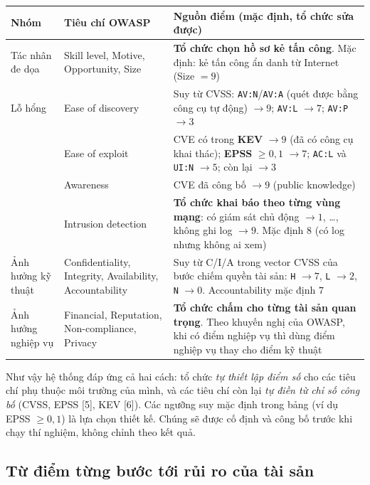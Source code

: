 \documentclass[11pt,a4paper]{article}
\begin{document}
\begin{center}
\small
\begin{tabular}{@{}Y{2.6cm}Y{3.4cm}Y{9.0cm}@{}}
\toprule
\textbf{Nhóm} & \textbf{Tiêu chí OWASP} & \textbf{Nguồn điểm (mặc định, tổ chức sửa được)} \\
\midrule
Tác nhân đe dọa & Skill level, Motive, Opportunity, Size & \textbf{Tổ chức chọn hồ sơ kẻ tấn công}. Mặc định: kẻ tấn công ẩn danh từ Internet (Size $= 9$) \\
\midrule
Lỗ hổng & Ease of discovery & Suy từ CVSS: \texttt{AV:N}/\texttt{AV:A} (quét được bằng công cụ tự động) $\to 9$; \texttt{AV:L} $\to 7$; \texttt{AV:P} $\to 3$ \\
 & Ease of exploit & CVE có trong \textbf{KEV} $\to 9$ (đã có công cụ khai thác); \textbf{EPSS} $\ge 0{,}1$ $\to 7$; \texttt{AC:L} và \texttt{UI:N} $\to 5$; còn lại $\to 3$ \\
 & Awareness & CVE đã công bố $\to 9$ (public knowledge) \\
 & Intrusion detection & \textbf{Tổ chức khai báo theo từng vùng mạng}: có giám sát chủ động $\to 1$, \ldots, không ghi log $\to 9$. Mặc định $8$ (có log nhưng không ai xem) \\
\midrule
Ảnh hưởng kỹ thuật & Confidentiality, Integrity, Availability, Accountability & Suy từ C/I/A trong vector CVSS của bước chiếm quyền tài sản: \texttt{H} $\to 7$, \texttt{L} $\to 2$, \texttt{N} $\to 0$. Accountability mặc định $7$ \\
Ảnh hưởng nghiệp vụ & Financial, Reputation, Non-compliance, Privacy & \textbf{Tổ chức chấm cho từng tài sản quan trọng}. Theo khuyến nghị của OWASP, khi có điểm nghiệp vụ thì dùng điểm nghiệp vụ thay cho điểm kỹ thuật \\
\bottomrule
\end{tabular}
\end{center}

Như vậy hệ thống đáp ứng cả hai cách: tổ chức \emph{tự thiết lập điểm số} cho các tiêu chí phụ thuộc môi trường của mình, và các tiêu chí còn lại \emph{tự điền từ chỉ số công bố} (CVSS, EPSS [5], KEV [6]). Các ngưỡng suy mặc định trong bảng (ví dụ EPSS $\ge 0{,}1$) là lựa chọn thiết kế. Chúng sẽ được cố định và công bố trước khi chạy thí nghiệm, không chỉnh theo kết quả.

\subsection{Từ điểm từng bước tới rủi ro của tài sản}
\end{document}
